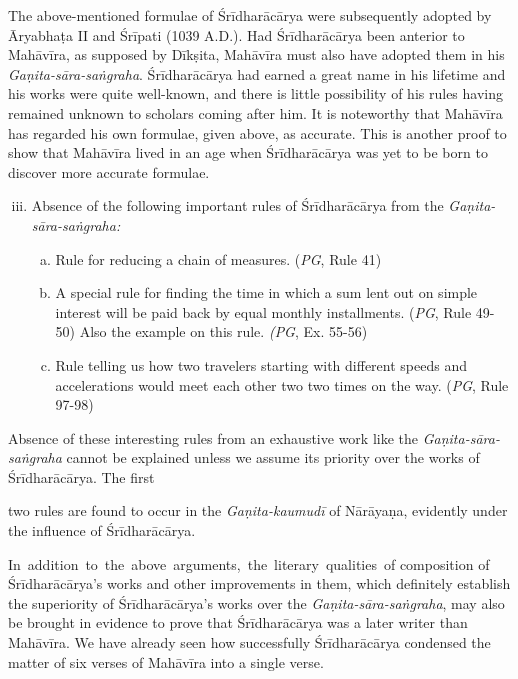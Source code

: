 \documentclass[10pt, openany]{book}
\begin{document}
{The above-mentioned formulae of Śrīdharācārya were} 
{subsequently adopted by Āryabhaṭa II and Śrīpati (1039 A.D.).}
{Had Śrīdharācārya been anterior to Mahāvīra, as supposed}
{by Dīkṣita, Mahāvīra must also have adopted them in his}
{\textit{Gaṇita-sāra-saṅgraha}. Śrīdharācārya had earned a great name}
{in his lifetime and his works were quite well-known, and there}
{is little possibility of his rules having remained unknown to}
{scholars coming after him. It is noteworthy that Mahāvīra}
{has regarded his own formulae, given above, as accurate.}
{This is another proof to show that Mahāvīra lived in an age}
{when Śrīdharācārya was yet to be born to discover more accurate formulae.}

\begin{enumerate}[(i)]
  \setcounter{enumi}{2}
\item{Absence of the following important rules of Śrīdharācārya from the \textit{Gaṇita-sāra-saṅgraha:}}

\begin{enumerate}[(a)]

\item{Rule for reducing a chain of measures. (\textit{PG}, Rule 41)}

\item{A special rule for finding the time in which a sum}
{lent out on simple interest will be paid back by}
{equal monthly installments. (\emph{PG}, Rule 49-50) Also the}
{example on this rule. \textit{(PG}, Ex. 55-56)}

\item{Rule telling us how two travelers starting with different}
{speeds and accelerations would meet each other two} 
{two times on the way. (\emph{PG}, Rule 97-98)}

\end{enumerate}
\end{enumerate}

{Absence of these interesting rules from an exhaustive}
{work like the \textit{Gaṇita-sāra-saṅgraha} cannot be explained unless
we}
{assume its priority over the works of Śrīdharācārya. The first}

\newpage

\justify{}
{two rules are found to occur in the \textit{Gaṇita-kaumudī} of Nārāyaṇa,}
{evidently under the influence of Śrīdharācārya.}

 \vspace{0.3cm}
{In \,addition \,to \,the \,above \,arguments, \,the \,literary \,qualities \,of composition of Śrīdharācārya's works and other improvements in them, which definitely establish the superiority of}
{Śrīdharācārya's works over the \textit{Gaṇita-sāra-saṅgraha}, may also}
{be brought in evidence to prove that Śrīdharācārya was a}
{later writer than Mahāvīra. We have already seen how}
{successfully Śrīdharācārya condensed the matter of six verses}
{of Mahāvīra into a single verse.}
\end{document}
